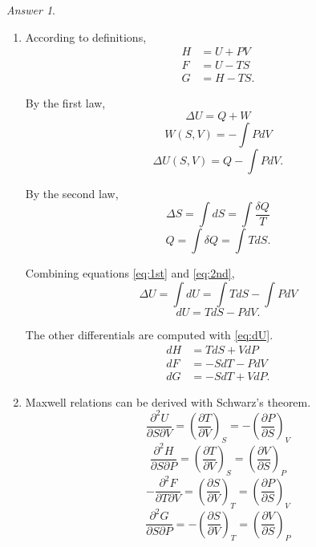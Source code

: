 \documentclass[a4paper, 12pt]{article}
\theoremstyle{definition}
\theoremstyle{remark}
\newtheorem*{answer}{Answer}
\begin{document}
\begin{answer}
    \begin{enumerate}
        \item According to definitions,
            \begin{align*}
                H &= U + PV \\
                F &= U - TS \\
                G &= H - TS.
            \end{align*}

            By the first law,
            \[ \Delta U = Q + W \]
            \[ W(S, V) = -\int PdV \]
            \begin{equation}
                \Delta U(S, V) = Q -\int PdV. \label{eq:1st}
            \end{equation}

            By the second law,
            \[ \Delta S = \int dS = \int \frac{\delta Q}{T} \]
            \begin{equation}
                Q = \int \delta Q = \int TdS. \label{eq:2nd}
            \end{equation}

            Combining equations \eqref{eq:1st} and \eqref{eq:2nd},
            \[ \Delta U = \int dU = \int TdS - \int PdV \]
            \begin{equation}
                dU = TdS - PdV. \label{eq:dU}
            \end{equation}

            The other differentials are computed with \eqref{eq:dU}.
            \begin{align*}
                dH &= TdS + VdP \\
                dF &= -SdT - PdV \\
                dG &= -SdT + VdP.
            \end{align*}

        \item Maxwell relations can be derived with Schwarz's theorem.
            \[
                \frac{\partial^2 U}{\partial S \partial V}
                = \left( \frac{\partial T}{\partial V} \right)_S
                = -\left( \frac{\partial P}{\partial S} \right)_V
            \]
            \[
                \frac{\partial^2 H}{\partial S \partial P}
                = \left( \frac{\partial T}{\partial V} \right)_S
                = \left( \frac{\partial V}{\partial S} \right)_P
            \]
            \[
                -\frac{\partial^2 F}{\partial T \partial V}
                = \left( \frac{\partial S}{\partial V} \right)_T
                = \left( \frac{\partial P}{\partial S} \right)_V
            \]
            \[
                \frac{\partial^2 G}{\partial S \partial P}
                = -\left( \frac{\partial S}{\partial V} \right)_T
                = \left( \frac{\partial V}{\partial S} \right)_P
            \]
    \end{enumerate}
\end{answer}
\end{document}
